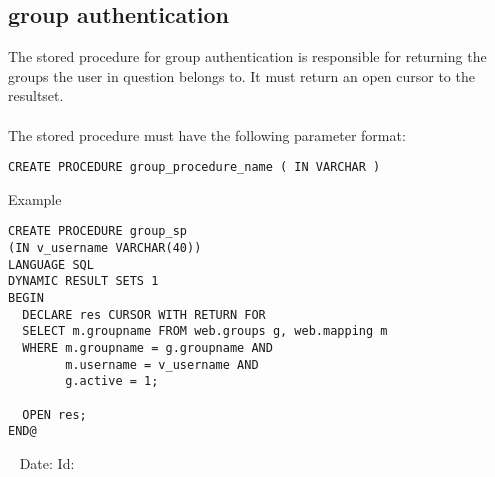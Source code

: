 \documentclass[11pt,letterpaper]{article}
\newcommand{\showtext}[2]{
\ifdata
#1#2
\fi
}
\begin{document}
\begin{appendix}
\subsection{group authentication} \label{groupsp}
The stored procedure for group authentication is responsible for returning the groups the user in question belongs to. It must return an open cursor to the resultset.\\
\\
The stored procedure must have the following parameter format:
\begin{verbatim}
CREATE PROCEDURE group_procedure_name ( IN VARCHAR )
\end{verbatim}
Example
\begin{verbatim}
CREATE PROCEDURE group_sp
(IN v_username VARCHAR(40))
LANGUAGE SQL
DYNAMIC RESULT SETS 1
BEGIN
  DECLARE res CURSOR WITH RETURN FOR
  SELECT m.groupname FROM web.groups g, web.mapping m 
  WHERE m.groupname = g.groupname AND
        m.username = v_username AND
        g.active = 1;

  OPEN res;
END@
\end{verbatim}

\end{appendix}

\begin{center}
\vspace{\fill}\ \newline
{\tiny \rm \showtext{Date: }\CommitDateTimeTz{} }
{\tiny \rm \showtext{Id: }\CommitHash{} }
\end{center}
\end{document}

